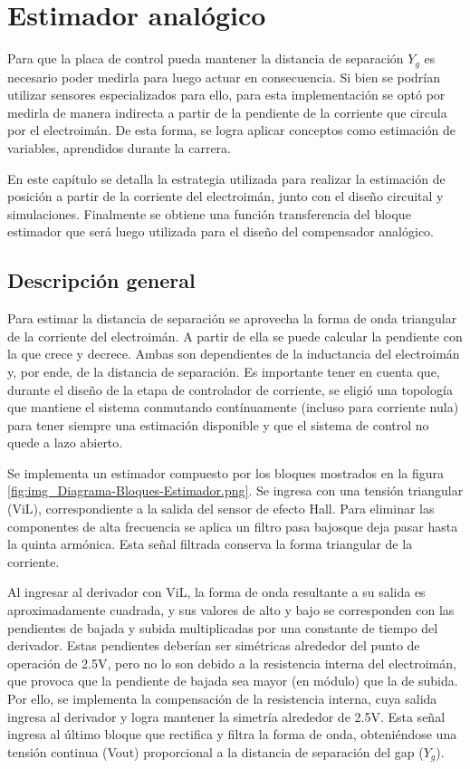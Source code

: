 \chapter{Estimador analógico}  \label{cap:Estimador Analogico}


 Para que la placa de control pueda mantener la distancia de separación $Y_{g}$ es necesario poder medirla para luego actuar en consecuencia. Si bien se podrían utilizar sensores  especializados para ello, para esta implementación se optó por  medirla de manera indirecta a partir de la pendiente de la corriente que circula por el electroimán. De esta forma, se logra aplicar conceptos como estimación de variables, aprendidos durante la carrera. 
 
 En este capítulo se detalla la estrategia utilizada para realizar la estimación de posición a partir de la corriente del electroimán, junto con el diseño circuital y simulaciones. Finalmente se obtiene una función transferencia del bloque estimador que será luego utilizada para el diseño del compensador analógico.

\section{Descripción general}


Para estimar la distancia de separación se aprovecha la forma de onda triangular de la corriente del electroimán. A partir de ella se puede calcular la pendiente con la que crece y decrece. Ambas son dependientes de la inductancia del electroimán y, por ende, de la distancia de separación. Es importante tener en cuenta que, durante el diseño de la etapa de controlador de corriente, se eligió una topología que mantiene el sistema conmutando contínuamente (incluso para corriente nula) para tener siempre una estimación disponible y que el sistema de control no quede a lazo abierto.


\noindent Se implementa un estimador compuesto por los bloques mostrados en la figura \ref{fig:img_Diagrama-Bloques-Estimador.png}. Se ingresa con una tensi\'{o}n triangular (ViL), correspondiente a la salida del sensor de efecto Hall. Para eliminar las componentes de alta frecuencia se aplica un filtro pasa bajosque deja pasar hasta la quinta arm\'{o}nica. Esta se\~{n}al filtrada conserva la forma triangular de la corriente. 

\noindent Al ingresar al derivador con ViL, la forma de onda resultante a su salida es aproximadamente cuadrada, y sus valores de alto y bajo se corresponden con las pendientes de bajada y subida multiplicadas por una constante de tiempo del derivador. Estas pendientes deber\'{i}an ser sim\'{e}tricas alrededor del punto de operaci\'{o}n de 2.5V, pero no lo son debido a la resistencia interna del electroim\'{a}n, que provoca que la pendiente de bajada sea mayor (en m\'{o}dulo) que la de subida. Por ello, se implementa la compensaci\'{o}n de la resistencia interna, cuya salida ingresa al derivador y logra mantener la simetr\'{i}a alrededor de 2.5V. Esta se\~{n}al ingresa al \'{u}ltimo bloque que rectifica y filtra la forma de onda, obteni\'{e}ndose una tensi\'{o}n continua (Vout) proporcional a la distancia de separaci\'{o}n del gap ($Y_{g}$).

